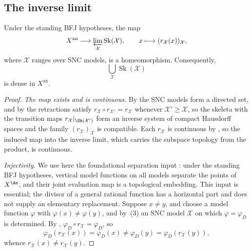 \subsection{The inverse limit}

\begin{theorem}\label{thm:skeleton-inverse-limit}
Under the standing BFJ hypotheses, the map
\[
 X^{\mathrm{an}}\longrightarrow
 \varprojlim_{\mathcal X}\operatorname{Sk}(\mathcal X),
 \qquad
 x\longmapsto(r_{\mathcal X}(x))_{\mathcal X},
\]
where $\mathcal X$ ranges over SNC models, is a homeomorphism.
Consequently,
\[
 \bigcup_{\mathcal X}\operatorname{Sk}(\mathcal X)
\]
is dense in $X^{\mathrm{an}}$.
\end{theorem}

\begin{proof}
\emph{The map exists and is continuous.} By  the SNC
models form a directed set, and by  the
retractions satisfy $r_{\mathcal X}\circ r_{\mathcal X'}=r_{\mathcal X}$
whenever $\mathcal X'\ge\mathcal X$, so the skeleta with the transition
maps $r_{\mathcal X}|_{\Sk(\mathcal X')}$ form an inverse system of
compact Hausdorff spaces and the family
$(r_{\mathcal X})_{\mathcal X}$ is compatible. Each $r_{\mathcal X}$ is
continuous by , so the induced map into the
inverse limit, which carries the subspace topology from the product, is
continuous.

\emph{Injectivity.} We use here the foundational separation input
\cite[Corollaries~2.3 and~2.5]{BFJ16}: under the standing BFJ hypotheses,
vertical model functions on all models separate the points of $X^{\An}$,
and their joint evaluation map is a topological embedding.  This input is
essential; the divisor of a general rational function has a horizontal part
and does not supply an elementary replacement.  Suppose $x\neq y$, and
choose a model function
$\varphi$ with $\varphi(x)\neq\varphi(y)$, and by
\,(3) an SNC model $\mathcal X$ on which
$\varphi=\varphi_D$ is determined. By
, $\varphi_D\circ r_{\mathcal X}
=\varphi_D$, so
\[
 \varphi_D(r_{\mathcal X}(x))=\varphi_D(x)
 \neq\varphi_D(y)=\varphi_D(r_{\mathcal X}(y)),
\]
whence $r_{\mathcal X}(x)\neq r_{\mathcal X}(y)$.


\end{proof}
